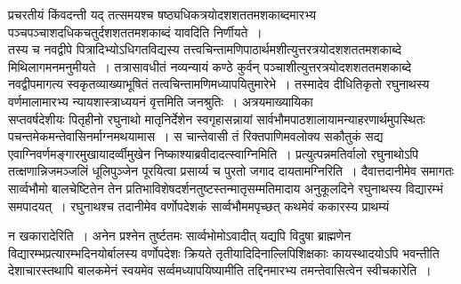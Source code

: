 \documentclass[10pt, openany]{book}
\begin{document}
प्रचरतीयं किंवदन्ती यद् तत्समयश्च  षष्ठ्यधिकत्रयोदशशततमशकाब्दमारभ्य पञ्चपञ्चाशदधिकचतुर्दशशततमशकाब्दं यावदिति निर्णीयते~।\\

तस्य च नवद्वीपे पित्रादिभ्योऽधिगतविद्यस्य तत्त्वचिन्तामणिपाठार्थमशीत्युत्तरत्रयोदशशततमशकाब्दे मिथिलागमनमनुमीयते~। तत्रासावधीतं नव्यन्यायं कण्ठे कुर्वन् पञ्चाशीत्युत्तरत्रयोदशशततमशकाब्दे नवद्वीपमागत्य स्वकृतव्याख्याभूषितं तत्वचिन्तामणिमध्यापयितुमारेभे~। तस्मादेव दीधितिकृतो रघुनाथस्य वर्णमालामारभ्य न्यायशास्त्राध्ययनं  वृत्तमिति जनश्रुतिः~। अत्रयमाख्यायिका \textendash \\

सप्तवर्षदेशीयः पितृहीनो रघुनाथो मातृनिर्देशेन स्वगृहासन्नायां सार्वभौमपाठशालायामन्याहरणार्थमुपस्थितः पचन्तमेकमन्तेवासिनर्माग्नमथयामास~। स चान्तेवासी तं रिक्तपाणिमवलोक्य सकौतुकं सद्य एवाग्निवर्णमङ्गारमुखायादर्व्वीमुखेन निष्काश्याब्रवीदादत्स्वाग्निमिति~।  प्रत्युत्पन्नमतिर्वालो रघुनाथोऽपि तत्क्षणान्निजमञ्जलिं धूलिपुञ्जेन पूरयित्वा प्रसार्य्य च पुरतो जगाद दायतामग्निरिति~। दैवात्तदानीमेव समागतः सार्व्वभौमो बालचेष्टितेन तेन प्रतिभाविशेषदर्शनतुष्टस्तन्मातृसम्मतिमादाय अनुकूलदिने रघुनाथस्य विद्यारम्भं समपादयत्~। रघुनाथश्च तदानीमेव वर्णोपदेशकं सार्व्वभौममपृच्छत् कथमेवं ककारस्य प्राथम्यं

\newpage
\noindent
न खकारादेरिति~। अनेन प्रश्नेन तुर्ष्टतमः सार्व्वभोमोऽवादीत् यद्यपि विदुषा ब्राह्मणेन विद्यारम्भप्रत्यारम्भदिनयोर्बालस्य वर्णोपदेशः क्रियते तृतीयादिदिनाल्लिपिशिक्षकाः कायस्थादयोऽपि भवन्तीति देशाचारस्तथापि बालकमेनं स्वयमेव सर्व्वमध्यापयिष्यामीति तद्दिनमारभ्य तमन्तेवासित्वेन स्वीचकारेति~।\\
\end{document}
